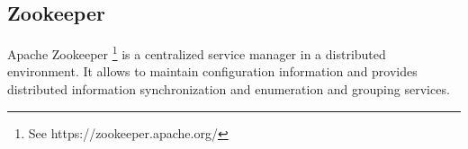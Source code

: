 \documentclass[12pt,english]{book}
\begin{document}
\subsection{Zookeeper}

Apache Zookeeper \footnote{See https://zookeeper.apache.org/} is a centralized service manager in a distributed environment. It allows to maintain configuration information and provides distributed information synchronization and enumeration and grouping services.




\end{document}
